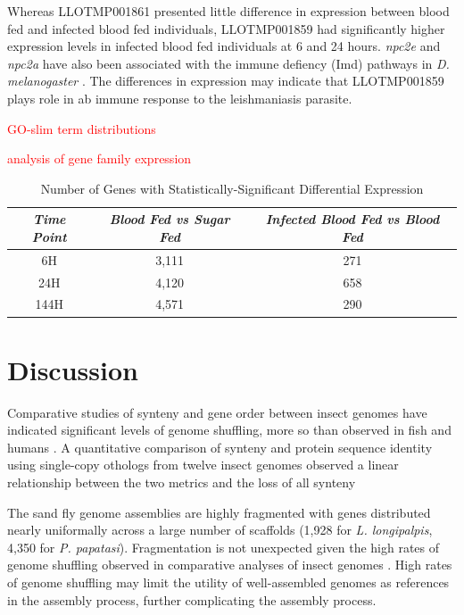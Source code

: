 Whereas LLOTMP001861 presented little difference in expression between blood fed and infected blood fed individuals, LLOTMP001859 had significantly higher expression levels in infected blood fed individuals at 6 and 24 hours.  \emph{npc2e} and \emph{npc2a} have also been associated with the immune defiency (Imd) pathways in \emph{D. melanogaster} \cite{Shi2012}.  The differences in expression may indicate that LLOTMP001859 plays role in ab immune response to the leishmaniasis parasite. 

\textcolor{red}{GO-slim term distributions}

\textcolor{red}{analysis of gene family expression}

\begin{table}[H]
  \centering
  \begin{tabular}{c c c} \hline
  \emph{Time Point} & \emph{Blood Fed vs Sugar Fed} & \emph{Infected Blood Fed vs Blood Fed} \\ \hline
  6H & 3,111 & 271 \\ \hline
  24H & 4,120 & 658 \\ \hline
  144H & 4,571 & 290 \\ \hline
  \end{tabular}
  \caption{Number of Genes with Statistically-Significant Differential Expression}
  \label{tab:stat-sig-genes}
\end{table}

\section{Discussion}
Comparative studies of synteny and gene order between insect genomes have indicated significant levels of genome shuffling, more so than observed in fish and humans \cite{Zdobnov2007}. A quantitative comparison of synteny and protein sequence identity using single-copy othologs from twelve insect genomes observed a linear relationship between the two metrics and the loss of all synteny

The sand fly genome assemblies are highly fragmented with genes distributed nearly uniformally across a large number of scaffolds (1,928 for \emph{L. longipalpis}, 4,350 for \emph{P. papatasi}).  Fragmentation is not unexpected given the high rates of genome shuffling observed in comparative analyses of insect genomes \cite{Zdobnov2007,Ranz2001}.  High rates of genome shuffling may limit the utility of well-assembled genomes as references in the assembly process, further complicating the assembly process.

